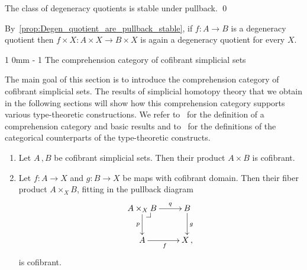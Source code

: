 \documentclass[reqno,10pt,a4paper,oneside,draft]{amsart}
\makeatletter
\renewcommand{\section}{\@startsection
{section}%
{1}%
{0mm}%
{-\baselineskip}%
{1\baselineskip}%
{\Large \bfseries}}%
\numberwithin{equation}{section}
\theoremstyle{mythm}
\theoremstyle{mydef}
\theoremstyle{myrmk}
\newcommand{\pullback}[1]{\save*!/#1-1.2pc/#1:(-1,1)@^{|-}\restore}
\newcommand{\drpullback}{\pullback{dr}}
\newcommand{\co}{\colon}
\makeatother
\begin{document}
\begin{proposition}
\label{prop:Degen_quotient_are_pullback_stable}
The class of degeneracy quotients is stable under pullback.  \qed
\end{proposition}


By~\cref{prop:Degen_quotient_are_pullback_stable}, if $f \co A \rightarrow B$ is a degeneracy quotient  then $f \times X \co A \times X \rightarrow B \times X$ is again a degeneracy quotient for every $X$.


\section{The comprehension category of cofibrant simplicial sets}
\label{sec:basrp}

The main goal of this section is to introduce the comprehension category of cofibrant simplicial sets. The
results of simplicial homotopy theory that we obtain in the following sections will show how this 
comprehension category supports various type-theoretic constructions. We refer to~\cite{JacobsB:catltt} for the definition of a comprehension category and basic results and to~\cite{LumsdaineP:locuoc} for the
definitions of the categorical counterparts of the type-theoretic constructs.  


\begin{lemma}\label{lem:cofibrant_fiber_product} \hfill 
\begin{enumerate}[$(i)$] 
\item Let $A \, , B$ be cofibrant simplicial sets. Then their product $A \times B$ is cofibrant.
\item Let $f \co A \to X$ and $g \co B \to X$ be maps with  cofibrant domain. Then their
fiber product $A \times_X B$, fitting in the pullback diagram
\[
\xymatrix{
A \times_X B \drpullback \ar[r]^-{q} \ar[d]_-{p} & B \ar[d]^g \\
A \ar[r]_f & X \, ,}
\]
is cofibrant.
\end{enumerate}
\end{lemma}
\end{document}
